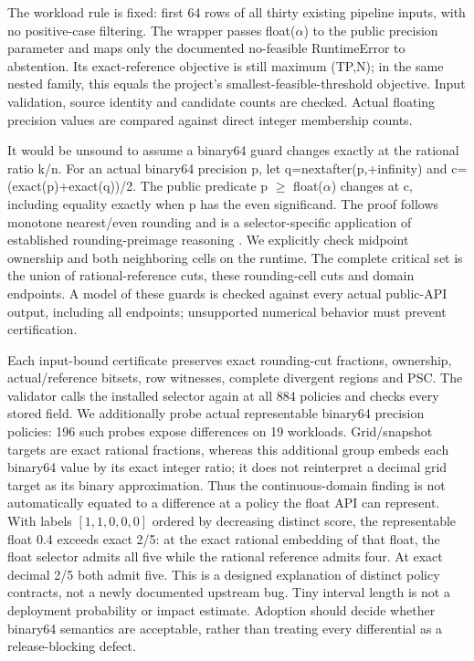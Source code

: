 \documentclass[11pt,a4paper]{article}
\theoremstyle{plain}
\theoremstyle{definition}
\theoremstyle{remark}
\begin{document}
The workload rule is fixed: first 64 rows of all thirty existing pipeline inputs, with no positive-case filtering. The wrapper passes float($\alpha$) to the public precision parameter and maps only the documented no-feasible RuntimeError to abstention. Its exact-reference objective is still maximum (TP,N); in the same nested family, this equals the project's smallest-feasible-threshold objective. Input validation, source identity and candidate counts are checked. Actual floating precision values are compared against direct integer membership counts.

It would be unsound to assume a binary64 guard changes exactly at the rational ratio k/n. For an actual binary64 precision p, let q=nextafter(p,+infinity) and c=(exact(p)+exact(q))/2. The public predicate p $\ge$ float($\alpha$) changes at c, including equality exactly when p has the even significand. The proof follows monotone nearest/even rounding and is a selector-specific application of established rounding-preimage reasoning \cite{andrlon2023finding}. We explicitly check midpoint ownership and both neighboring cells on the runtime. The complete critical set is the union of rational-reference cuts, these rounding-cell cuts and domain endpoints. A model of these guards is checked against every actual public-API output, including all endpoints; unsupported numerical behavior must prevent certification.

Each input-bound certificate preserves exact rounding-cut fractions, ownership, actual/reference bitsets, row witnesses, complete divergent regions and PSC. The validator calls the installed selector again at all 884 policies and checks every stored field. We additionally probe actual representable binary64 precision policies: 196 such probes expose differences on 19 workloads. Grid/snapshot targets are exact rational fractions, whereas this additional group embeds each binary64 value by its exact integer ratio; it does not reinterpret a decimal grid target as its binary approximation. Thus the continuous-domain finding is not automatically equated to a difference at a policy the float API can represent. With labels $[1, 1, 0, 0, 0]$ ordered by decreasing distinct score, the representable float 0.4 exceeds exact 2/5: at the exact rational embedding of that float, the float selector admits all five while the rational reference admits four. At exact decimal 2/5 both admit five. This is a designed explanation of distinct policy contracts, not a newly documented upstream bug. Tiny interval length is not a deployment probability or impact estimate. Adoption should decide whether binary64 semantics are acceptable, rather than treating every differential as a release-blocking defect.
\end{document}
